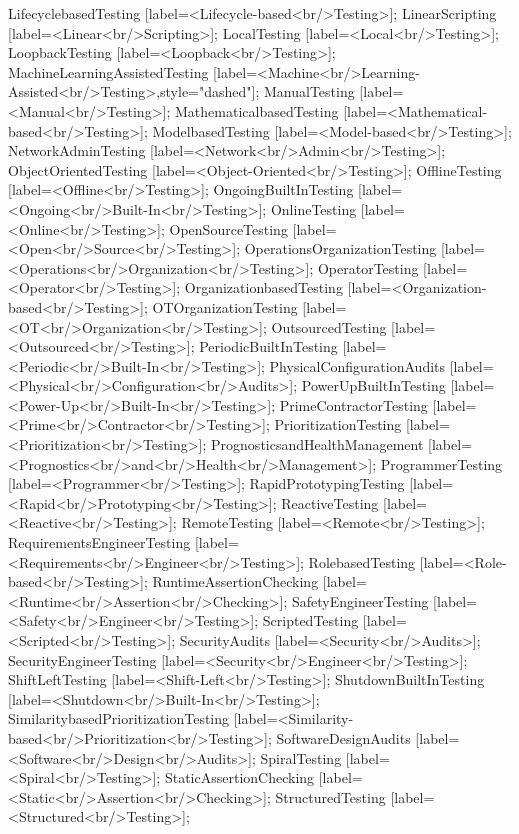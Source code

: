 \documentclass{article}
\begin{document}
{LifecyclebasedTesting [label=<Lifecycle-based<br/>Testing>];
LinearScripting [label=<Linear<br/>Scripting>];
LocalTesting [label=<Local<br/>Testing>];
LoopbackTesting [label=<Loopback<br/>Testing>];
MachineLearningAssistedTesting [label=<Machine<br/>Learning-Assisted<br/>Testing>,style="dashed"];
ManualTesting [label=<Manual<br/>Testing>];
MathematicalbasedTesting [label=<Mathematical-based<br/>Testing>];
ModelbasedTesting [label=<Model-based<br/>Testing>];
NetworkAdminTesting [label=<Network<br/>Admin<br/>Testing>];
ObjectOrientedTesting [label=<Object-Oriented<br/>Testing>];
OfflineTesting [label=<Offline<br/>Testing>];
OngoingBuiltInTesting [label=<Ongoing<br/>Built-In<br/>Testing>];
OnlineTesting [label=<Online<br/>Testing>];
OpenSourceTesting [label=<Open<br/>Source<br/>Testing>];
OperationsOrganizationTesting [label=<Operations<br/>Organization<br/>Testing>];
OperatorTesting [label=<Operator<br/>Testing>];
OrganizationbasedTesting [label=<Organization-based<br/>Testing>];
OTOrganizationTesting [label=<OT<br/>Organization<br/>Testing>];
OutsourcedTesting [label=<Outsourced<br/>Testing>];
PeriodicBuiltInTesting [label=<Periodic<br/>Built-In<br/>Testing>];
PhysicalConfigurationAudits [label=<Physical<br/>Configuration<br/>Audits>];
PowerUpBuiltInTesting [label=<Power-Up<br/>Built-In<br/>Testing>];
PrimeContractorTesting [label=<Prime<br/>Contractor<br/>Testing>];
PrioritizationTesting [label=<Prioritization<br/>Testing>];
PrognosticsandHealthManagement [label=<Prognostics<br/>and<br/>Health<br/>Management>];
ProgrammerTesting [label=<Programmer<br/>Testing>];
RapidPrototypingTesting [label=<Rapid<br/>Prototyping<br/>Testing>];
ReactiveTesting [label=<Reactive<br/>Testing>];
RemoteTesting [label=<Remote<br/>Testing>];
RequirementsEngineerTesting [label=<Requirements<br/>Engineer<br/>Testing>];
RolebasedTesting [label=<Role-based<br/>Testing>];
RuntimeAssertionChecking [label=<Runtime<br/>Assertion<br/>Checking>];
SafetyEngineerTesting [label=<Safety<br/>Engineer<br/>Testing>];
ScriptedTesting [label=<Scripted<br/>Testing>];
SecurityAudits [label=<Security<br/>Audits>];
SecurityEngineerTesting [label=<Security<br/>Engineer<br/>Testing>];
ShiftLeftTesting [label=<Shift-Left<br/>Testing>];
ShutdownBuiltInTesting [label=<Shutdown<br/>Built-In<br/>Testing>];
SimilaritybasedPrioritizationTesting [label=<Similarity-based<br/>Prioritization<br/>Testing>];
SoftwareDesignAudits [label=<Software<br/>Design<br/>Audits>];
SpiralTesting [label=<Spiral<br/>Testing>];
StaticAssertionChecking [label=<Static<br/>Assertion<br/>Checking>];
StructuredTesting [label=<Structured<br/>Testing>];
}
\end{document}
